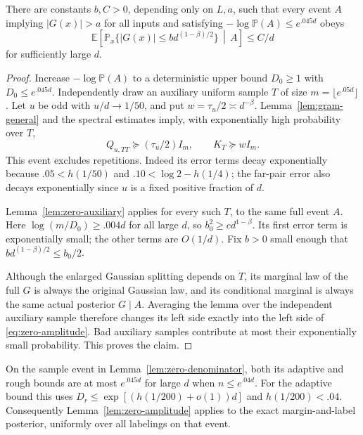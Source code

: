 \begin{lemma}\label{lem:zero-amplitude}
There are constants $b,C>0$, depending only on $L,a$, such that every
event $A$ implying $|G(x)|>a$ for all inputs and satisfying
$-\log\mathbb P(A)\le e^{.045d}$ obeys
\begin{equation}\label{eq:zero-amplitude}
 \mathbb E\!\left[\mathbb P_x\{|G(x)|\le b d^{(1-\beta)/2}\}
                    \,\middle|\,A\right]\le C/d
\end{equation}
for sufficiently large $d$.
\end{lemma}
\begin{proof}
Increase $-\log\mathbb P(A)$ to a deterministic upper bound $D_0\ge1$
with $D_0\le e^{.045d}$. Independently draw an auxiliary uniform sample
$T$ of size $m=\lfloor e^{.05d}\rfloor$. Let $u$ be odd with
$u/d\to1/50$, and put $w=\tau_u/2\asymp d^{-\beta}$.
Lemma~\ref{lem:gram-general} and the spectral estimates imply, with
exponentially high probability over $T$,
\[
 Q_{u,TT}\succeq (\tau_u/2)I_m,
 \qquad K_T\succeq wI_m.
\]
This event excludes repetitions. Indeed its error terms decay
exponentially because
$ .05<h(1/50)$ and $.10<\log2-h(1/4)$; the far-pair error also decays
exponentially since $u$ is a fixed positive fraction of $d$.

Lemma~\ref{lem:zero-auxiliary} applies for every such $T$, to the same
full event $A$. Here $\log(m/D_0)\ge .004d$ for all large $d$, so
$b_0^2\ge c d^{1-\beta}$. Its first error term is exponentially small;
the other terms are $O(1/d)$. Fix $b>0$ small enough that
$b d^{(1-\beta)/2}\le b_0/2$.

Although the enlarged Gaussian splitting depends on $T$, its marginal
law of the full $G$ is always the original Gaussian law, and its
conditional marginal is always the same actual posterior $G\mid A$.
Averaging the lemma over the independent auxiliary sample therefore
changes its left side exactly into the left side of
\eqref{eq:zero-amplitude}. Bad auxiliary samples contribute at most
their exponentially small probability. This proves the claim.
\end{proof}

On the sample event in Lemma~\ref{lem:zero-denominator}, both its
adaptive and rough bounds are at most $e^{.045d}$ for large $d$ when
$n\le e^{.04d}$. For the adaptive bound this uses
$D_r\le\exp[(h(1/200)+o(1))d]$ and $h(1/200)<.04$.
Consequently Lemma~\ref{lem:zero-amplitude} applies to the exact
margin-and-label posterior, uniformly over all labelings on that event.
